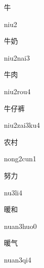 \begin{multicols*}{2}
\begin{verbete}[niu2]{牛}
\begin{pronuncia}{niu2}
\end{pronuncia}
\end{verbete}

\begin{verbete}{牛奶}
\begin{pronuncia}{niu2nai3}
\end{pronuncia}
\end{verbete}

\begin{verbete}{牛肉}
\begin{pronuncia}{niu2rou4}
\end{pronuncia}
\end{verbete}

\begin{verbete}{牛仔裤}
\begin{pronuncia}{niu2zai3ku4}
\end{pronuncia}
\end{verbete}

\begin{verbete}{农村}
\begin{pronuncia}{nong2cun1}
\end{pronuncia}
\end{verbete}

\begin{verbete}[nu3li4]{努力}
\begin{pronuncia}{nu3li4}
\end{pronuncia}
\end{verbete}

\begin{verbete}{暖和}
\begin{pronuncia}{nuan3huo0}
\end{pronuncia}
\end{verbete}

\begin{verbete}[nuan3qi4]{暖气}
\begin{pronuncia}{nuan3qi4}
\end{pronuncia}
\end{verbete}


\end{multicols*}
